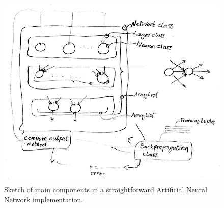 \documentclass[conference]{IEEEtran}
\begin{document}
\begin{figure}[htp]
\centerline{\includegraphics[width=1\columnwidth]{ANNimplementationSketch.png}}
\caption{Sketch of main components in a straightforward Artificial Neural Network implementation.}
\label{annImplementationSketch}
\end{figure}
\end{document}
